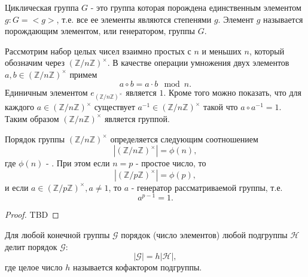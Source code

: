 \begin{definition}
Циклическая группа $G$ - это группа которая порождена единственным
элементом $g: G = <g>$, т.е. все ее элементы являются степенями $g$.
Элемент $g$ называется порождающим элементом, или генератором, группы $G$.
\label{def:add:algebra:cyclic_group}
\end{definition}

\begin{definition}
Рассмотрим набор целых чисел взаимно простых с $n$ и меньших $n$,
который обозначим через $\left(\mathbb{Z}/n\mathbb{Z}\right)^\times$. В
качестве операции умножения двух элементов $a,b \in
\left(\mathbb{Z}/n\mathbb{Z}\right)^\times$ примем
\[
a \circ b = a \cdot b \mod n.
\]
Единичным элементом $e_{\left(\mathbb{Z}/n\mathbb{Z}\right)^\times}$
является $1$. Кроме того можно показать, что для 
каждого $a \in \left(\mathbb{Z}/n\mathbb{Z}\right)^\times$
существует $a^{-1} \in \left(\mathbb{Z}/n\mathbb{Z}\right)^\times$
такой что $a \circ a^{-1} = 1$. Таким образом
$\left(\mathbb{Z}/n\mathbb{Z}\right)^\times$ является группой.
\label{def:add:algebra:mult_group}
\end{definition}

\begin{theorem}
Порядок группы $\left(\mathbb{Z}/n\mathbb{Z}\right)^\times$
определяется следующим соотношением
\[
\left|\left(\mathbb{Z}/n\mathbb{Z}\right)^\times\right| = \phi(n),
\]
где $\phi(n)$ - .
При этом если 
$n=p$ - простое число, то
\[
\left|\left(\mathbb{Z}/p\mathbb{Z}\right)^\times\right| = \phi(p),
\]
и если $a \in \left(\mathbb{Z}/p\mathbb{Z}\right)^\times, a \ne 1$,
то $a$ - генератор рассматриваемой группы, т.е.
\[
a^{p-1} = 1.
\]
\begin{proof}
TBD
\end{proof}
\label{thm:add:algebra:cyclic_mult_group}
\end{theorem}

\begin{theorem}[Лагранж]
\label{thm:lagrange}
Для любой конечной группы $\mathcal{G}$ порядок (число элементов)
любой подгруппы $\mathcal{H}$ делит порядок $\mathcal{G}$:
\[
\left|\mathcal{G}\right| = h \left|\mathcal{H}\right|,
\] 
где целое число $h$ называется кофактором подгруппы.
\end{theorem}
